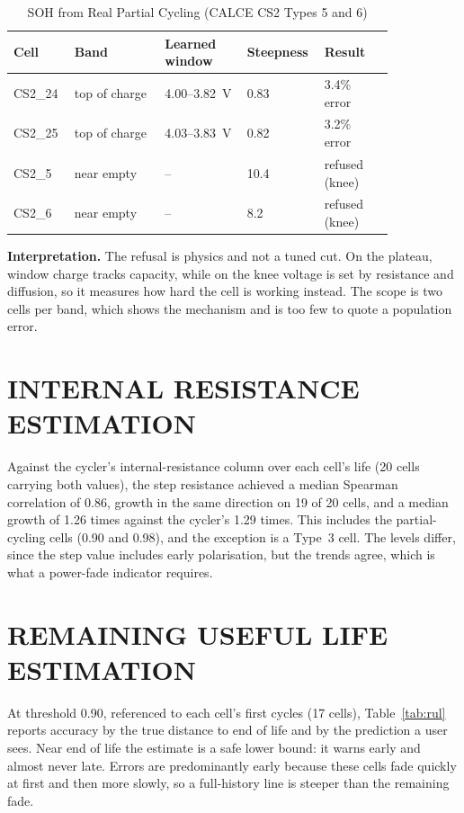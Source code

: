 \begin{table}[htbp]
	\caption{SOH from Real Partial Cycling (CALCE CS2 Types 5 and 6)}
	\centering
	\small
	\renewcommand{\arraystretch}{1.15}
	\setlength{\tabcolsep}{4pt}
	\begin{tabular}{|L{0.13\linewidth}|L{0.22\linewidth}|C{0.2\linewidth}|C{0.12\linewidth}|L{0.17\linewidth}|}
		\hline
		\textbf{Cell} & \textbf{Band} & \textbf{Learned window} & \textbf{Steepness} & \textbf{Result} \\
		\hline
		CS2\_24 & top of charge & 4.00--3.82~V & 0.83 & 3.4\% error \\
		\hline
		CS2\_25 & top of charge & 4.03--3.83~V & 0.82 & 3.2\% error \\
		\hline
		CS2\_5 & near empty & -- & 10.4 & refused (knee) \\
		\hline
		CS2\_6 & near empty & -- & 8.2 & refused (knee) \\
		\hline
	\end{tabular}
	\label{tab:partial}
\end{table}

\textbf{Interpretation.} The refusal is physics and not a tuned cut. On the plateau, window charge tracks capacity, while on the knee voltage is set by resistance and diffusion, so it measures how hard the cell is working instead. The scope is two cells per band, which shows the mechanism and is too few to quote a population error.

\section{INTERNAL RESISTANCE ESTIMATION}
\label{sec:res-r}

Against the cycler's internal-resistance column over each cell's life (20 cells carrying both values), the step resistance achieved a median Spearman correlation of 0.86, growth in the same direction on 19 of 20 cells, and a median growth of 1.26 times against the cycler's 1.29 times. This includes the partial-cycling cells (0.90 and 0.98), and the exception is a Type~3 cell. The levels differ, since the step value includes early polarisation, but the trends agree, which is what a power-fade indicator requires.

\section{REMAINING USEFUL LIFE ESTIMATION}
\label{sec:res-rul}

At threshold 0.90, referenced to each cell's first cycles (17 cells), Table~\ref{tab:rul} reports accuracy by the true distance to end of life and by the prediction a user sees. Near end of life the estimate is a safe lower bound: it warns early and almost never late. Errors are predominantly early because these cells fade quickly at first and then more slowly, so a full-history line is steeper than the remaining fade.

